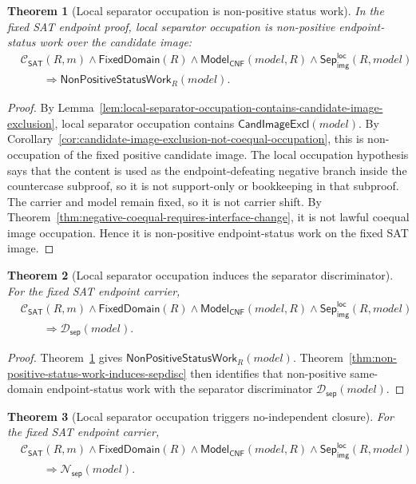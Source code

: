 \documentclass[11pt]{article}
\newtheorem{theorem}{Theorem}[section]
\theoremstyle{definition}
\theoremstyle{remark}
\newcommand{\LocalSepImgOcc}{\mathsf{Sep}_{\mathsf{img}}^{\mathsf{loc}}}
\newcommand{\ClayCtx}{\mathcal{C}_{\mathsf{SAT}}(R,m)}
\newcommand{\FixedDom}{\mathsf{FixedDomain}}
\newcommand{\SepDisc}{\mathcal{D}_{\mathsf{sep}}}
\newcommand{\NoSepDisc}{\mathcal{N}_{\mathsf{sep}}}
\newcommand{\ModelOfCnf}{\mathsf{Model}_{\mathsf{CNF}}}
\newcommand{\CandImageExcl}{\mathsf{CandImageExcl}}
\newcommand{\NonPositiveStatusWork}{\mathsf{NonPositiveStatusWork}}
\begin{document}
\begin{theorem}[Local separator occupation is non-positive status work]
\label{thm:local-sepocc-is-non-positive-status-work}
In the fixed SAT endpoint proof, local separator occupation is non-positive endpoint-status work over the candidate image:
\[
\begin{aligned}
  &\ClayCtx\wedge\FixedDom(R)\wedge\ModelOfCnf(model,R)\wedge\LocalSepImgOcc(R,model)\\
  &\qquad\Rightarrow \NonPositiveStatusWork_R(model).
\end{aligned}
\]
\end{theorem}

\begin{proof}
By Lemma~\ref{lem:local-separator-occupation-contains-candidate-image-exclusion}, local separator occupation contains \(\CandImageExcl(model)\). By Corollary~\ref{cor:candidate-image-exclusion-not-coequal-occupation}, this is non-occupation of the fixed positive candidate image. The local occupation hypothesis says that the content is used as the endpoint-defeating negative branch inside the countercase subproof, so it is not support-only or bookkeeping in that subproof. The carrier and model remain fixed, so it is not carrier shift. By Theorem~\ref{thm:negative-coequal-requires-interface-change}, it is not lawful coequal image occupation. Hence it is non-positive endpoint-status work on the fixed SAT image.
\end{proof}

\begin{theorem}[Local separator occupation induces the separator discriminator]
\label{thm:local-sepocc-induces-sepdisc}
For the fixed SAT endpoint carrier,
\[
\begin{aligned}
  &\ClayCtx\wedge\FixedDom(R)\wedge\ModelOfCnf(model,R)\wedge\LocalSepImgOcc(R,model)\\
  &\qquad\Rightarrow \SepDisc(model).
\end{aligned}
\]
\end{theorem}

\begin{proof}
Theorem~\ref{thm:local-sepocc-is-non-positive-status-work} gives \(\NonPositiveStatusWork_R(model)\). Theorem~\ref{thm:non-positive-status-work-induces-sepdisc} then identifies that non-positive same-domain endpoint-status work with the separator discriminator \(\SepDisc(model)\).
\end{proof}

\begin{theorem}[Local separator occupation triggers no-independent closure]
\label{thm:local-sepocc-triggers-noindependent}
For the fixed SAT endpoint carrier,
\[
\begin{aligned}
  &\ClayCtx\wedge\FixedDom(R)\wedge\ModelOfCnf(model,R)\wedge\LocalSepImgOcc(R,model)\\
  &\qquad\Rightarrow \NoSepDisc(model).
\end{aligned}
\]
\end{theorem}
\end{document}
